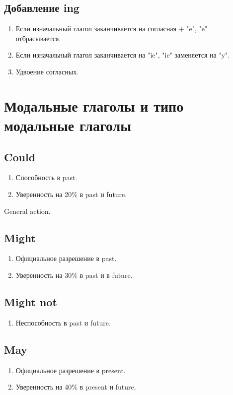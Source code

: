 \documentclass[oneside]{book}
\begin{document}
	\section{Добавление ing}
	\begin{enumerate}
		\item Если изначальный глагол заканчивается на согласная + "e"{}, "e" отбрасывается.
		\item Если изначальный глагол заканчивается на "ie"{}, "ie" заменяется на "y".
		\item Удвоение согласных.
	\end{enumerate}

	\chapter{Модальные глаголы и типо модальные глаголы}
	\section{Could}
	\begin{enumerate}
		\item Способность в past.
		\item Уверенность на 20\% в past и future.
	\end{enumerate}

	General action.

	\section{Might}
	\begin{enumerate}
		\item Официальное разрешение в past.
		\item Уверенность на 30\% в past и в future.
	\end{enumerate}

	\section{Might not}
	\begin{enumerate}
		\item Неспособность в past и future.
	\end{enumerate}

	\section{May}
	\begin{enumerate}
		\item Официальное разрешение в present.
		\item Уверенность на 40\% в present и future.
	\end{enumerate}
\end{document}
